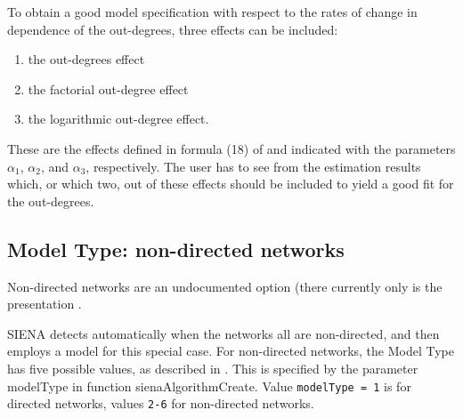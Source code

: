 \documentclass[a4paper,fleqn,11pt]{article}
\newcommand{\+}{\, + \,}
\newcommand{\sfn}[1]{\textsf{#1}}
\newcommand{\SI}{{\sf SIENA }}
\begin{document}
To obtain a good model specification with respect to the rates of
change in dependence of the out-degrees, three effects can be
included:
\begin{enumerate}
\item the out-degrees effect
\item the factorial out-degree effect
\item the logarithmic out-degree effect.
\end{enumerate}
These are the effects defined in formula (18) of \citet{Snijders03}
and indicated with the parameters $\alpha_1$, $\alpha_2$,
and $\alpha_3$, respectively.
The user has to see from the estimation results which, or which two,
out of these effects
should be included to yield a good fit for the out-degrees.
\medskip
\fi

\subsection{Model Type: non-directed networks}
\label{S_modeltype_nd}

Non-directed networks are an undocumented option (there currently
only is the presentation \citet{Snijders07}.

\SI detects automatically when the networks all are non-directed,
and then employs a model for this special case.
For non-directed networks, the Model Type has five possible values,
as described in \citet{Snijders07}.
This is specified by the parameter \sfn{modelType} in function
\sfn{sienaAlgorithmCreate}.
Value \texttt{modelType = 1} is for directed networks, values
\texttt{2-6} for non-directed networks.
\end{document}
